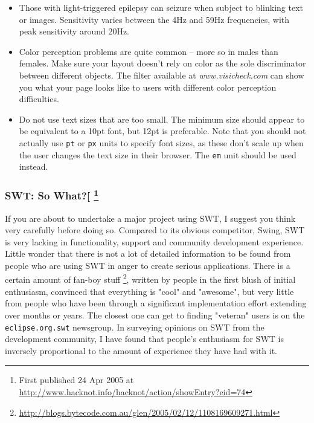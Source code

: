 \documentclass{article}
\begin{document}
\begin{enumerate}
\begin{itemize}
\item Those with light-triggered epilepsy can seizure when subject to
blinking text or images. Sensitivity varies between the 4Hz and 59Hz
frequencies, with peak sensitivity around 20Hz.
\item Color perception problems are quite common -- more so in males than
females. Make sure your layout doesn't rely on color as the sole
discriminator between different objects. The filter available at
\emph{www.visicheck.com} can show you what your page looks like to users
with different color perception difficulties.
\item Do not use text sizes that are too small. The minimum size should
appear to be equivalent to a 10pt font, but 12pt is preferable. Note
that you should not actually use \texttt{pt} or \texttt{px} units to specify font
sizes, as these don't scale up when the user changes the text size in
their browser. The \texttt{em} unit should be used instead.
\end{itemize}
\end{enumerate}

\subsubsection{SWT: So What?[ \footnote{First published 24 Apr 2005 at
\url{http://www.hacknot.info/hacknot/action/showEntry?eid=74}}}
\label{sec:orgheadline300}

If you are about to undertake a major project using SWT, I suggest you
think very carefully before doing so. Compared to its obvious
competitor, Swing, SWT is very lacking in functionality, support and
community development experience. Little wonder that there is not a lot
of detailed information to be found from people who are using SWT in
anger to create serious applications. There is a certain amount of
fan-boy stuff \footnote{\url{http://blogs.bytecode.com.au/glen/2005/02/12/1108169609271.html}}, written by people in the first blush of initial
enthusiasm, convinced that everything is "cool" and "awesome", but very
little from people who have been through a significant implementation
effort extending over months or years. The closest one can get to
finding "veteran" users is on the \texttt{eclipse.org.swt} newsgroup. In
surveying opinions on SWT from the development community, I have found
that people's enthusiasm for SWT is inversely proportional to the amount
of experience they have had with it.
\end{document}
